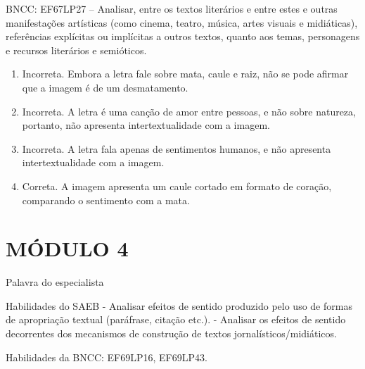 BNCC: EF67LP27 -- Analisar, entre os textos literários e entre estes e
outras manifestações artísticas (como cinema, teatro, música, artes
visuais e midiáticas), referências explícitas ou implícitas a outros
textos, quanto aos temas, personagens e recursos literários e
semióticos.

\begin{enumerate}
\def\labelenumi{\alph{enumi})}
\item Incorreta. Embora a letra fale sobre mata, caule e raiz, não se pode
afirmar que a imagem é de um desmatamento.
\item Incorreta. A letra é uma canção de amor entre pessoas, e não sobre
natureza, portanto, não apresenta intertextualidade com a imagem.
\item Incorreta. A letra fala apenas de sentimentos humanos, e não
apresenta intertextualidade com a imagem.
\item Correta. A imagem apresenta um caule cortado em formato de coração,
comparando o sentimento com a mata.
\end{enumerate}

\section{MÓDULO 4}

Palavra do especialista

Habilidades do SAEB - Analisar efeitos de sentido produzido pelo uso de
formas de apropriação textual (paráfrase, citação etc.). - Analisar os
efeitos de sentido decorrentes dos mecanismos de construção de textos
jornalísticos/midiáticos.

Habilidades da BNCC: EF69LP16, EF69LP43.

